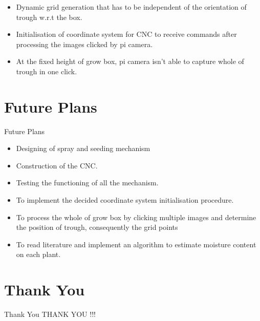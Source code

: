 \documentclass[12pt, a4paper]{beamer}
\begin{document}
\begin{frame}
	\begin{itemize}
		\item Dynamic grid generation that has to be independent of the orientation of trough w.r.t the box. 
		\item Initialisation of coordinate system for CNC to receive commands after processing the images clicked by pi camera.
		\item At the fixed height of grow box, pi camera isn't able to capture whole of trough in one click.
	\end{itemize}
\end{frame}

\section{Future Plans}
\begin{frame}{Future Plans}
	\begin{itemize}
		\item Designing of spray and seeding mechanism
		\item Construction of the CNC.
		\item Testing the functioning of all the mechanism.
	\end{itemize}
\end{frame}

\begin{frame}
	\begin{itemize}
		\item To implement the decided coordinate system initialisation procedure.
		\item To process the whole of grow box by clicking multiple images and determine the position of trough, consequently the grid points
		\item To read literature and implement an algorithm to estimate moisture content on each plant.  
	\end{itemize}
\end{frame}

\section{Thank You}
\begin{frame}{Thank You}
	\centering THANK YOU !!!
\end{frame}
\end{document}
